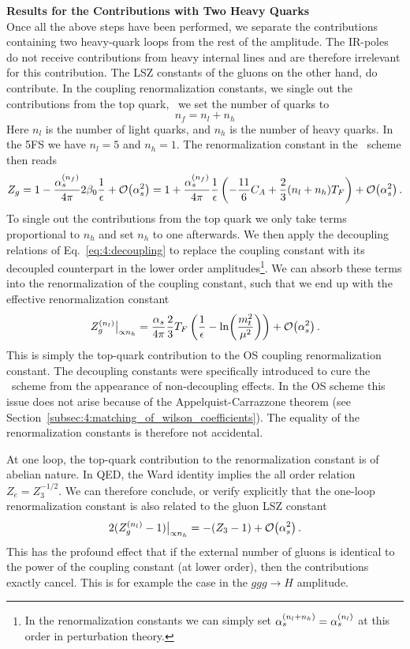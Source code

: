 \textbf{Results for the Contributions with Two Heavy Quarks} \\
Once all the above steps have been performed, we separate the contributions containing two heavy-quark loops from the rest of the amplitude. The \acs{IR}-poles do not receive contributions from heavy internal lines and are therefore irrelevant for this contribution. The LSZ constants of the gluons on the other hand, do contribute. In the coupling renormalization constants, we single out the contributions from the top quark, \ie\ we set the number of quarks to
\begin{equation}
n_f = n_l + n_h
\end{equation}
Here $n_l$ is the number of light quarks, and $n_h$ is the number of heavy quarks. In the 5\acs{FS} we have $n_l = 5$ and $n_h = 1$. The renormalization constant in the \MS\ scheme then reads
\begin{equation}
Z_g = 1 - \frac{\alpha_s^{(n_f)}}{4 \pi}  2 \beta_0 \frac{1}{\epsilon} + \mathcal{O}\!\left(\alpha_s^2\right) = 1 + \frac{\alpha_s^{(n_f)}}{4 \pi} \frac{1}{\epsilon} \left(- \frac{11}{6} C_A + \frac{2}{3} (n_l + n_h) T_F \right) + \mathcal{O}\!\left(\alpha_s^2\right).
\end{equation}
To single out the contributions from the top quark we only take terms proportional to $n_h$ and set $n_h$ to one afterwards. We then apply the decoupling relations of Eq.~\eqref{eq:4:decoupling} to replace the coupling constant with its decoupled counterpart in the lower order amplitudes\footnote{In the renormalization constants we can simply set $\alpha_s^{(n_l + n_h)} = \alpha_s^{(n_l)}$ at this order in perturbation theory.}. We can absorb these terms into the renormalization of the coupling constant, such that we end up with the effective renormalization constant
\begin{equation}
Z_g^{(n_l)} \big \vert_{\propto n_h} = \frac{\alpha_s}{4 \pi} \frac{2}{3} T_F \left(\frac{1}{\epsilon} - \ln\!\left(\frac{m_t^2}{\mu^2}\right) \right) + \mathcal{O}\!\left(\alpha_s^2\right).
\end{equation}
This is simply the top-quark contribution to the \acs{OS} coupling renormalization constant. The decoupling constants were specifically introduced to cure the \MS\ scheme from the appearance of non-decoupling effects. In the \acs{OS} scheme this issue does not arise because of the Appelquist-Carrazzone theorem (see Section~\ref{subsec:4:matching_of_wilson_coefficients}). The equality of the renormalization constants is therefore not accidental.

At one loop, the top-quark contribution to the renormalization constant is of abelian nature. In \acs{QED}, the Ward identity implies the all order relation $Z_e = Z_3^{-1/2}$. We can therefore conclude, or verify explicitly that the one-loop renormalization constant is also related to the gluon LSZ constant
\begin{equation}
2 (Z_g^{(n_l)} - 1) \big \vert_{\propto n_h} = - (Z_3 - 1) + \mathcal{O}\!\left(\alpha_s^2\right).
\end{equation}
This has the profound effect that if the external number of gluons is identical to the power of the coupling constant (at lower order), then the contributions exactly cancel. This is for example the case in the $ggg \rightarrow H$ amplitude.

